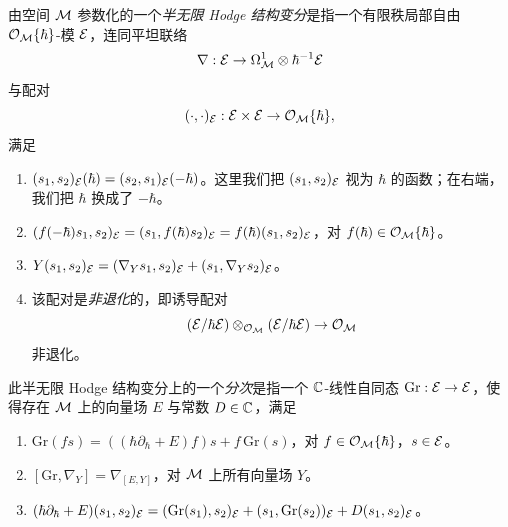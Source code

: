 \begin{definition}
由空间 $\mathcal{M}$ 参数化的一个\emph{半无限 Hodge 结构变分}是指一个有限秩局部自由 $\mathcal{O}_{\mathcal{M}}\{\hbar\}$-模 $\mathcal{E}$，连同平坦联络
\[
\nabla:\mathcal{E}\to\Omega^1_{\mathcal{M}}\otimes\hbar^{-1}\mathcal{E}
\]
与配对
\[
(\cdot,\cdot)_{\mathcal{E}}:\mathcal{E}\times\mathcal{E}\to\mathcal{O}_{\mathcal{M}}\{\hbar\},
\]
满足
\begin{enumerate}[label=(\arabic*)]
\item $(s_1,s_2)_{\mathcal{E}}(\hbar)=(s_2,s_1)_{\mathcal{E}}(-\hbar)$。这里我们把 $(s_1,s_2)_{\mathcal{E}}$ 视为 $\hbar$ 的函数；在右端，我们把 $\hbar$ 换成了 $-\hbar$。
\item $(f(-\hbar)s_1,s_2)_{\mathcal{E}}=(s_1,f(\hbar)s_2)_{\mathcal{E}}=f(\hbar)(s_1,s_2)_{\mathcal{E}}$，对 $f(\hbar)\in\mathcal{O}_{\mathcal{M}}\{\hbar\}$。
\item $Y(s_1,s_2)_{\mathcal{E}}=(\nabla_Y s_1,s_2)_{\mathcal{E}}+(s_1,\nabla_Y s_2)_{\mathcal{E}}$。
\item 该配对是\emph{非退化}的，即诱导配对
\[
(\mathcal{E}/\hbar\mathcal{E})\otimes_{\mathcal{O}_{\mathcal{M}}}(\mathcal{E}/\hbar\mathcal{E})\to\mathcal{O}_{\mathcal{M}}
\]
非退化。
\end{enumerate}
此半无限 Hodge 结构变分上的一个\emph{分次}是指一个 $\mathbb{C}$-线性自同态 $\mathrm{Gr}:\mathcal{E}\to\mathcal{E}$，使得存在 $\mathcal{M}$ 上的向量场 $E$ 与常数 $D\in\mathbb{C}$，满足
\begin{enumerate}[label=(\arabic*),start=5]
\item $\mathrm{Gr}(fs)=((\hbar\partial_\hbar+E)f)s+f\,\mathrm{Gr}(s)$，对 $f\in\mathcal{O}_{\mathcal{M}}\{\hbar\}$，$s\in\mathcal{E}$。
\item $[\mathrm{Gr},\nabla_Y]=\nabla_{[E,Y]}$，对 $\mathcal{M}$ 上所有向量场 $Y$。
\item $(\hbar\partial_\hbar+E)(s_1,s_2)_{\mathcal{E}}=(\mathrm{Gr}(s_1),s_2)_{\mathcal{E}}+(s_1,\mathrm{Gr}(s_2))_{\mathcal{E}}+D(s_1,s_2)_{\mathcal{E}}$。
\end{enumerate}
\end{definition}

